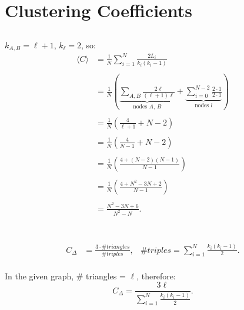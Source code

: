 \documentclass {article}
\begin{document}
\section{Clustering Coefficients}

\subsection{}

$ k_{A, B} = \ell + 1$, $k_{\ell} = 2 $, so:
\begin{align*}
\langle C \rangle & = \frac{ 1 }{ N } \sum\limits_{ i=1 }^N \frac{ 2 L_i }{ k_i (k_i - 1) } \\ \\
& = \frac{ 1 }{ N } \left( \underbrace{\sum\limits_{ A,B } \frac{ 2 \ell }{ (\ell + 1) \ell }}_\text{nodes $A$, $B$} + \underbrace{ \sum\limits_{ i=0 }^{N-2} \frac{ 2 \cdot 1 }{ 2 \cdot 1 }}_\text{nodes $l$} \right) \\ \\
& = \frac{ 1 }{ N } \left( \frac{ 4 }{ \ell + 1 } + N - 2  \right) \\ \\
& = \frac{ 1 }{ N } \left( \frac{ 4 }{ N - 1 } + N - 2  \right) \\ \\
& = \frac{ 1 }{ N } \left( \frac{ 4 + (N - 2)(N - 1) }{ N - 1 } \right) \\ \\
& = \frac{ 1 }{ N } \left( \frac{ 4 + N^2 - 3N + 2 }{ N - 1 }  \right) \\ \\
& = \frac{ N^2 - 3N + 6 }{ N^2 - N }. \\ \\
\end{align*}

\subsection{}

\begin{align*}
C_{\Delta} &= \frac{ 3 \cdot \# triangles }{ \# triples },
& \# triples = \sum\limits_{ i=1 }^N \frac{ k_i (k_i - 1) }{ 2 }.\\
\end{align*}

In the given graph, $ \# $ triangles = $ \ell $, therefore:
$$ C_{\Delta} = \frac{ 3 \ell }{ \sum\limits_{ i=1 }^N \frac{ k_i (k_i - 1) }{ 2 }}. $$
 
\end{document}
